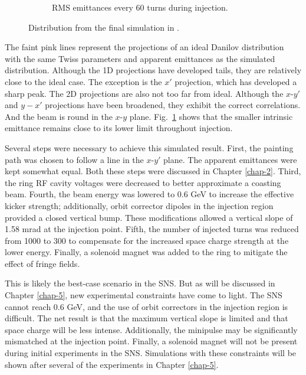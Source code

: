\begin{figure}[!p]
\begin{subfigure}{0.5\textwidth}
        \caption{RMS emittances every 60 turns during injection.}
        \label{fig:Holmes_emittances}
    \end{subfigure}
    \caption{Distribution from the final simulation in \cite{Holmes2018}.}
    \label{fig:Holmes}
\end{figure}
%
The faint pink lines represent the projections of an ideal Danilov distribution with the same Twiss parameters and apparent emittances as the simulated distribution. Although the 1D projections have developed tails, they are relatively close to the ideal case. The exception is the $x'$ projection, which has developed a sharp peak. The 2D projections are also not too far from ideal. Although the $x$-$y'$ and $y-x'$ projections have been broadened, they exhibit the correct correlations. And the beam is round in the $x$-$y$ plane. Fig.~\ref{fig:Holmes_emittances} shows that the smaller intrinsic emittance remains close to its lower limit throughout injection. 

Several steps were necessary to achieve this simulated result. First, the painting path was chosen to follow a line in the $x$-$y'$ plane. The apparent emittances were kept somewhat equal. Both these steps were discussed in Chapter \ref{chap-2}. Third, the ring RF cavity voltages were decreased to better approximate a coasting beam. Fourth, the beam energy was lowered to 0.6 GeV to increase the effective kicker strength; additionally, orbit corrector dipoles in the injection region provided a closed vertical bump. These modifications allowed a vertical slope of 1.58 mrad at the injection point. Fifth, the number of injected turns was reduced from 1000 to 300 to compensate for the increased space charge strength at the lower energy. Finally, a solenoid magnet was added to the ring to mitigate the effect of fringe fields. 

This is likely the best-case scenario in the SNS. But as will be discussed in Chapter \ref{chap-5}, new experimental constraints have come to light. The SNS cannot reach 0.6 GeV, and the use of orbit correctors in the injection region is difficult. The net result is that the maximum vertical slope is limited and that space charge will be less intense. Additionally, the minipulse may be significantly mismatched at the injection point. Finally, a solenoid magnet will not be present during initial experiments in the SNS. Simulations with these constraints will be shown after several of the experiments in Chapter \ref{chap-5}.




